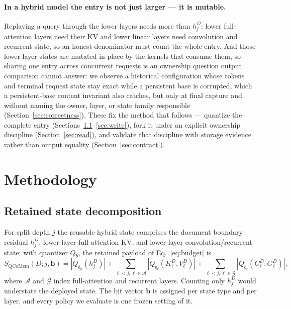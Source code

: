 \documentclass{article}
\begin{document}
\paragraph{In a hybrid model the entry is not just larger --- it is mutable.}
Replaying a query through the lower layers needs more than $h_j^D$: lower
full-attention layers need their KV and lower linear layers need convolution
and recurrent state, so an honest denominator must count the whole entry.  And
those lower-layer states are mutated in place by the kernels that consume them,
so sharing one entry across concurrent requests is an ownership question output
comparison cannot answer: we observe a historical configuration whose tokens
and terminal request state stay exact while a persistent base is corrupted,
which a persistent-base content invariant also catches, but only at final
capture and without naming the owner, layer, or state family responsible
(Section~\ref{sec:correctness}).  These fix the method that follows --- quantize
the complete entry
(Sections~\ref{sec:decomposition}--\ref{sec:write}), fork it under an explicit
ownership discipline (Section~\ref{sec:read}), and validate that discipline
with storage evidence rather than output equality
(Section~\ref{sec:contract}).

\section{Methodology}
\label{sec:method}

\subsection{Retained state decomposition}
\label{sec:decomposition}

For split depth $j$ the reusable hybrid state comprises the document boundary
residual $h_j^D$, lower-layer full-attention KV, and lower-layer
convolution/recurrent state; with quantizer $Q_b$, the retained payload of
Eq.~\ref{eq:budget} is
\begin{equation}
 S_{\mathrm{QCoMem}}(D;j,\mathbf b)=|Q_{b_h}(h_j^D)|+
 \sum_{\ell<j,\ell\in\mathcal A}|Q_{b_\ell}(K^D_\ell,V^D_\ell)|+
 \sum_{\ell<j,\ell\in\mathcal G}|Q_{b_\ell}(C^D_\ell,G^D_\ell)|,
\end{equation}
where $\mathcal A$ and $\mathcal G$ index full-attention and recurrent layers.
Counting only $h_j^D$ would understate the deployed state.  The bit vector
$\mathbf b$ is assigned per state type and per layer, and every policy we
evaluate is one frozen setting of it.
\end{document}

